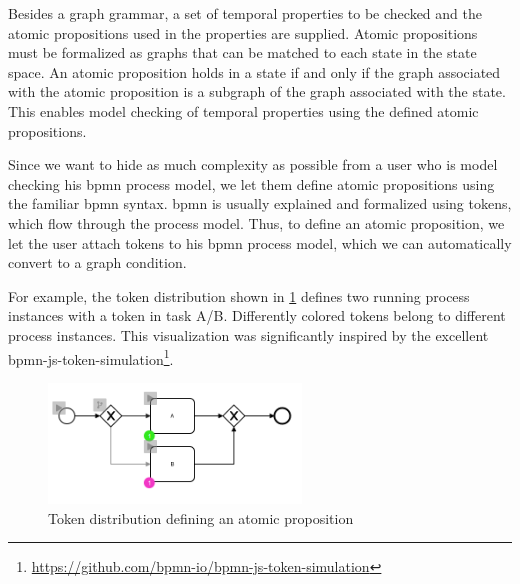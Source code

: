 \documentclass[adraft, copyright, creativecommons]{eptcs} %
\begin{document}
Besides a graph grammar, a set of temporal properties to be checked and the atomic propositions used in the properties are supplied.
Atomic propositions must be formalized as graphs that can be matched to each state in the state space.
An atomic proposition holds in a state if and only if the graph associated with the atomic proposition is a subgraph of the graph associated with the state. %
This enables model checking of temporal properties using the defined atomic propositions.

Since we want to hide as much complexity as possible from a user who is model checking his \gls*{bpmn} process model, we let them define atomic propositions using the familiar \gls*{bpmn} syntax.
\gls*{bpmn} is usually explained and formalized using tokens, which flow through the process model.
Thus, to define an atomic proposition, we let the user attach tokens to his \gls*{bpmn} process model, which we can automatically convert to a graph condition.

For example, the token distribution shown in \cref{fig:atomicProposition} defines two running process instances with a token in task A/B.
Differently colored tokens belong to different process instances.
This visualization was significantly inspired by the excellent bpmn-js-token-simulation\footnote{\url{https://github.com/bpmn-io/bpmn-js-token-simulation}}.

\begin{figure}[h]
    \centering
    \includegraphics[width=0.6\textwidth]{images/atomicProposition.png}
    \caption{Token distribution defining an atomic proposition}
    \label{fig:atomicProposition}
\end{figure}

\end{document}
